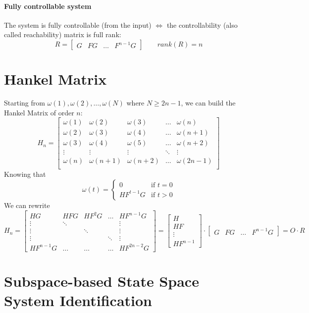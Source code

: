 \documentclass{report}
\begin{document}
\paragraph{Fully controllable system} The system is fully controllable (from the input) $\iff$ the controllability (also called reachability) matrix is full rank:
\[
R=\begin{bmatrix}
G&FG&\dots&F^{n-1}G
\end{bmatrix}
\qquad
rank(R)=n
\]

\section{Hankel Matrix}
Starting from $\omega(1),\omega(2),\dots,\omega(N)$ where $N\geq 2n-1$, we can build the Hankel Matrix of order $n$:
\[
H_n=\begin{bmatrix}
\omega(1)&\omega(2)&\omega(3)&\dots&\omega(n)\\
\omega(2)&\omega(3)&\omega(4)&\dots&\omega(n+1)\\
\omega(3)&\omega(4)&\omega(5)&\dots&\omega(n+2)\\
\vdots&\vdots&\vdots&\ddots&\vdots\\
\omega(n)&\omega(n+1)&\omega(n+2)&\dots&\omega(2n-1)\\
\end{bmatrix}
\]
Knowing that
\[
\omega(t)=
\begin{cases}
0&\text{if }t=0\\
HF^{t-1}G&\text{if }t>0
\end{cases}
\]
We can rewrite
\[
H_n=
\begin{bmatrix}
HG&HFG&HF^2G&\dots&HF^{n-1}G\\
\vdots&\ddots&&&\vdots\\
\vdots&&\ddots&&\vdots\\
\vdots&&&\ddots&\vdots\\
HF^{n-1}G&\dots&\dots&\dots&HF^{2n-2}G
\end{bmatrix}
=
\begin{bmatrix}
H\\HF\\\vdots\\HF^{n-1}
\end{bmatrix}
\cdot
\begin{bmatrix}
G&FG&\dots&F^{n-1}G
\end{bmatrix}
=
O\cdot R
\]

\section{Subspace-based State Space System Identification}
\end{document}
